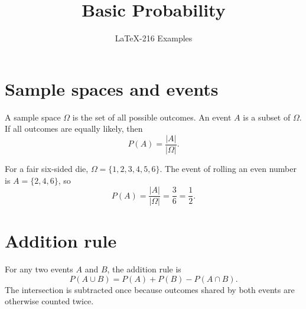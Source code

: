 \documentclass{article}
\title{Basic Probability}
\author{LaTeX-216 Examples}
\date{}
\begin{document}
\maketitle

\section{Sample spaces and events}
A sample space $\Omega$ is the set of all possible outcomes. An event $A$ is a
subset of $\Omega$. If all outcomes are equally likely, then
\[
  P(A)=\frac{|A|}{|\Omega|}.
\]

For a fair six-sided die, $\Omega=\{1,2,3,4,5,6\}$. The event of rolling an
even number is $A=\{2,4,6\}$, so
\[
  P(A)=\frac{|A|}{|\Omega|}=\frac{3}{6}=\frac{1}{2}.
\]

\section{Addition rule}
For any two events $A$ and $B$, the addition rule is
\[
  P(A\cup B)=P(A)+P(B)-P(A\cap B).
\]
The intersection is subtracted once because outcomes shared by both events
are otherwise counted twice.
\end{document}
